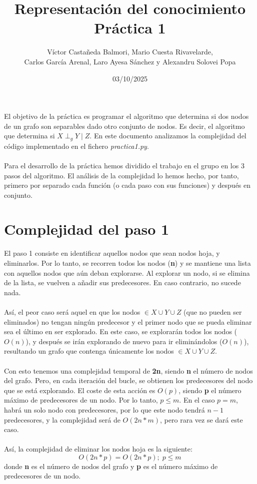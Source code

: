 \documentclass[a4paper,12pt]{article}
\title{Representación del conocimiento \\ Práctica 1}
\author{Víctor Castañeda Balmori, Mario Cuesta Rivavelarde, \\
Carlos García Arenal, Laro Ayesa Sánchez y Alexandru Solovei Popa}
\date{03/10/2025}
\begin{document}
\maketitle
\thispagestyle{fancy}
El objetivo de la práctica es programar el algoritmo que determina si dos nodos de un grafo son separables dado otro conjunto de nodos. Es decir, el algoritmo que determina si $X \perp _g Y \mid Z$. En este documento analizamos la complejidad del código implementado en el fichero \textit{practica1.py}. \\ \\
Para el desarrollo de la práctica hemos dividido el trabajo en el grupo en los 3 pasos del algoritmo. El análisis de la complejidad lo hemos hecho, por tanto, primero por separado cada función (o cada paso con sus funciones) y después en conjunto.

\section{Complejidad del paso 1}

El paso 1 consiste en identificar aquellos nodos que sean nodos hoja, y eliminarlos. Por lo tanto, se recorren todos los nodos (\textbf{n}) y se mantiene una lista con aquellos nodos que aún deban explorarse. Al explorar un nodo, si se elimina de la lista, se vuelven a añadir sus predecesores. En caso contrario, no sucede nada. \\ \\
Así, el peor caso será aquel en que los nodos $\in X \cup Y \cup Z$ (que no pueden ser eliminados) no tengan ningún predecesor y el primer nodo que se pueda eliminar sea el último en ser explorado. En este caso, se explorarán todos los nodos ($O(n)$), y después se irán explorando de nuevo para ir eliminándolos ($O(n)$), resultando un grafo que contenga únicamente los nodos $\in X \cup Y \cup Z$. \\ \\
Con esto tenemos una complejidad temporal de \textbf{2n}, siendo \textbf{n} el número de nodos del grafo. Pero, en cada iteración del bucle, se obtienen los predecesores del nodo que se está explorando. El coste de esta acción es $O(p)$, siendo \textbf{p} el número máximo de predecesores de un nodo. Por lo tanto, $p \le m$. En el caso $p = m$, habrá un solo nodo con predecesores, por lo que este nodo tendrá $n - 1$ predecesores, y la complejidad será de $O(2n*m)$, pero rara vez se dará este caso. \\ \\
Así, la complejidad de eliminar los nodos hoja es la siguiente:
$$O(2n*p) = O(2n*p); \; p \le m$$
donde \textbf{n} es el número de nodos del grafo y \textbf{p} es el número máximo de predecesores de un nodo.
\end{document}
